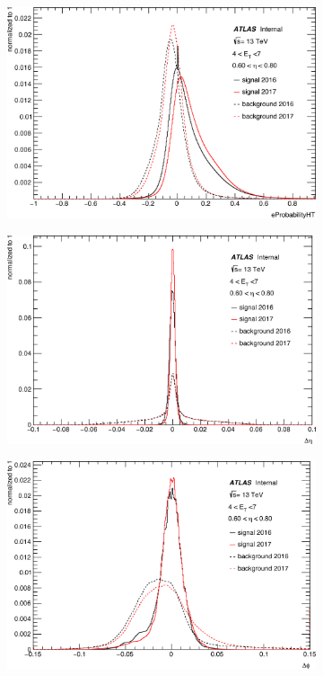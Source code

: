 \begin{figure}[p]
\centering
  \begin{subfigure}[b]{0.49\textwidth}
    \centering
    \includegraphics[width=1.0\textwidth]{figs/egamma/trig_eProb_lowet.png} 
    \label{fig:egamma:trig_eProbHT_lowet}
  \end{subfigure}
  \hfill
  \begin{subfigure}[b]{0.49\textwidth}
    \centering
    \includegraphics[width=1.0\textwidth]{figs/egamma/trig_deltaeta_lowet.png} 
    \label{fig:egamma:trig_deltaEta_1_lowet}
  \end{subfigure}
  \hfill
  \begin{subfigure}[b]{0.49\textwidth}
    \centering
    \includegraphics[width=1.0\textwidth]{figs/egamma/trig_deltaphi_lowet.png} 

\end{subfigure}
\end{figure}

